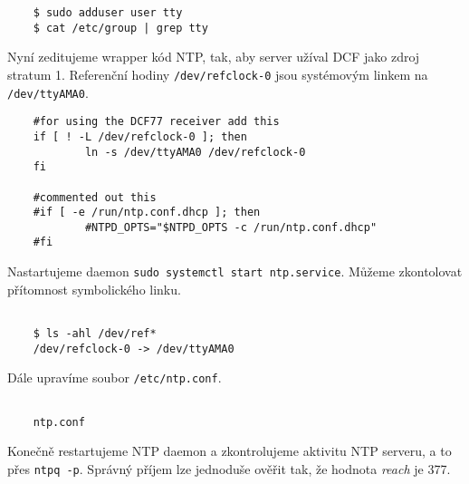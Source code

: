    \vspace{1em}

    \begin{lstlisting}
    $ sudo adduser user tty
    $ cat /etc/group | grep tty
    \end{lstlisting}

    \vspace{1em}

    Nyní zeditujeme wrapper kód NTP, tak, aby server užíval DCF jako zdroj stratum 1.
    Referenční hodiny \verb|/dev/refclock-0| jsou systémovým linkem na
    \verb|/dev/ttyAMA0|.

    \vspace{1em}

    \begin{lstlisting}
    #for using the DCF77 receiver add this
    if [ ! -L /dev/refclock-0 ]; then
            ln -s /dev/ttyAMA0 /dev/refclock-0
    fi

    #commented out this
    #if [ -e /run/ntp.conf.dhcp ]; then
            #NTPD_OPTS="$NTPD_OPTS -c /run/ntp.conf.dhcp"
    #fi
    \end{lstlisting}

    \vspace{1em}

\newpage

    Nastartujeme daemon \verb|sudo systemctl start ntp.service|. Můžeme zkontolovat
    přítomnost symbolického linku.


    \begin{lstlisting}

    $ ls -ahl /dev/ref*
    /dev/refclock-0 -> /dev/ttyAMA0

    \end{lstlisting}

    \vspace{1em}

    Dále upravíme soubor \verb|/etc/ntp.conf|.

    \begin{lstlisting}

    ntp.conf

    \end{lstlisting}

    \vspace{1em}

    Konečně restartujeme NTP daemon a zkontrolujeme aktivitu NTP serveru, a to přes
    \verb|ntpq -p|. Správný příjem lze jednoduše ověřit tak, že hodnota \textit{reach} je
    377.
    \\

